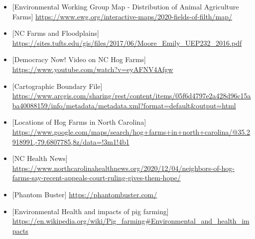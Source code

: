 \documentclass[
  12pt,
]{article}
\providecommand{\tightlist}{%
  \setlength{\itemsep}{0pt}\setlength{\parskip}{0pt}}
\begin{document}
\begin{itemize}
\tightlist
\item
  {[}Environmental Working Group Map - Distribution of Animal
  Agriculture Farms{]}
  \url{https://www.ewg.org/interactive-maps/2020-fields-of-filth/map/}
\item
  {[}NC Farms and Floodplains{]}
  \url{https://sites.tufts.edu/gis/files/2017/06/Moore_Emily_UEP232_2016.pdf}
\item
  {[}Democracy Now! Video on NC Hog Farms{]}
  \url{https://www.youtube.com/watch?v=eyAFNV4Afgw}
\item
  {[}Cartographic Boundary File{]}
  \url{https://www.arcgis.com/sharing/rest/content/items/05f6d4797e2a428d96c15aba40088159/info/metadata/metadata.xml?format=default\&output=html}
\item
  {[}Locations of Hog Farms in North Carolina{]}
  \url{https://www.google.com/maps/search/hog+farms+in+north+carolina/@35.2918991,-79.6807785,8z/data=!3m1!4b1}
\item
  {[}NC Health News{]}
  \url{https://www.northcarolinahealthnews.org/2020/12/04/neighbors-of-hog-farms-say-recent-appeals-court-ruling-gives-them-hope/}
\item
  {[}Phantom Buster{]} \url{https://phantombuster.com/}
\item
  {[}Environmental Health and impacts of pig farming{]}
  \url{https://en.wikipedia.org/wiki/Pig_farming\#Environmental_and_health_impacts}
\end{itemize}
\end{document}
